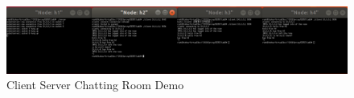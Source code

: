 \begin{exercise}[]
\begin{figure}[hb]
\begin{center}
  \includegraphics[width=14cm]{img/lab3/chat8.png}
  \caption{Client Server Chatting Room Demo}
  \label{fig:ex1}
  \end{center}
\end{figure}

  \label{ex1}
\end{exercise}


